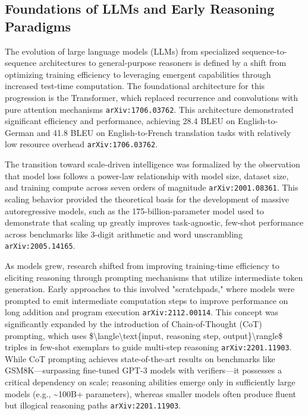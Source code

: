 \documentclass[11pt]{article}
\begin{document}
\subsection{Foundations of LLMs and Early Reasoning Paradigms}

The evolution of large language models (LLMs) from specialized sequence-to-sequence architectures to general-purpose reasoners is defined by a shift from optimizing training efficiency to leveraging emergent capabilities through increased test-time computation. The foundational architecture for this progression is the Transformer, which replaced recurrence and convolutions with pure attention mechanisms \texttt{arXiv:1706.03762}. This architecture demonstrated significant efficiency and performance, achieving 28.4 BLEU on English-to-German and 41.8 BLEU on English-to-French translation tasks with relatively low resource overhead \texttt{arXiv:1706.03762}.

The transition toward scale-driven intelligence was formalized by the observation that model loss follows a power-law relationship with model size, dataset size, and training compute across seven orders of magnitude \texttt{arXiv:2001.08361}. This scaling behavior provided the theoretical basis for the development of massive autoregressive models, such as the 175-billion-parameter model used to demonstrate that scaling up greatly improves task-agnostic, few-shot performance across benchmarks like 3-digit arithmetic and word unscrambling \texttt{arXiv:2005.14165}.

As models grew, research shifted from improving training-time efficiency to eliciting reasoning through prompting mechanisms that utilize intermediate token generation. Early approaches to this involved "scratchpads," where models were prompted to emit intermediate computation steps to improve performance on long addition and program execution \texttt{arXiv:2112.00114}. This concept was significantly expanded by the introduction of Chain-of-Thought (CoT) prompting, which uses \$\textbackslash{}langle\textbackslash{}text\{input, reasoning step, output\}\textbackslash{}rangle\$ triples in few-shot exemplars to guide multi-step reasoning \texttt{arXiv:2201.11903}. While CoT prompting achieves state-of-the-art results on benchmarks like GSM8K—surpassing fine-tuned GPT-3 models with verifiers—it possesses a critical dependency on scale; reasoning abilities emerge only in sufficiently large models (e.g., \textasciitilde{}100B+ parameters), whereas smaller models often produce fluent but illogical reasoning paths \texttt{arXiv:2201.11903}.
\end{document}
